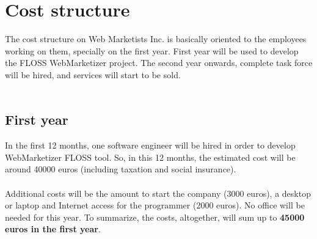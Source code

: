 \documentclass[11pt]{article}
\begin{document}
\section{Cost structure}
The cost structure on Web Marketists Inc. is basically oriented to the employees working on them, specially on the first year. First year will be used to develop the FLOSS WebMarketizer project. The second year onwards, complete task force will be hired, and services will start to be sold.\\
\\
\subsection{First year}
In the first 12 months, one software engineer will be hired in order to develop WebMarketizer FLOSS tool. So, in this 12 months, the estimated cost will be around 40000 euros (including taxation and social insurance).\\
\\
Additional costs will be the amount to start the company (3000 euros), a desktop or laptop and Internet access for the programmer (2000 euros). No office will be needed for this year. To summarize, the costs, altogether, will sum up to \textbf{45000 euros in the first year}.
\end{document}
